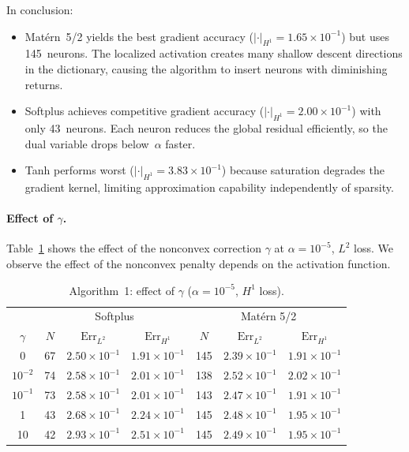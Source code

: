 \documentclass[12pt,fleqn]{amsart}
\theoremstyle{definition}
\begin{document}
In conclusion:
\begin{itemize}
	\item Mat\'ern~5/2 yields the best gradient accuracy ($|\cdot|_{H^1} = 1.65 \times 10^{-1}$) but uses 145~neurons. The localized activation creates many shallow descent directions in the dictionary, causing the algorithm to insert neurons with diminishing returns.
	\item Softplus achieves competitive gradient accuracy ($|\cdot|_{H^1} = 2.00 \times 10^{-1}$) with only 43~neurons. Each neuron reduces the global residual efficiently, so the dual variable drops below~$\alpha$ faster.
	\item Tanh performs worst ($|\cdot|_{H^1} = 3.83 \times 10^{-1}$) because saturation degrades the gradient kernel, limiting approximation capability independently of sparsity.
\end{itemize}

\paragraph{\textbf{Effect of $\gamma$.}}
Table~\ref{tab:alg1_gamma} shows the effect of the nonconvex correction $\gamma$ at $\alpha = 10^{-5}$, $L^2$ loss.
We observe the effect of the nonconvex penalty depends on the activation function. 

\begin{table}[H]
\centering
\caption{Algorithm~1: effect of $\gamma$ ($\alpha = 10^{-5}$, $H^1$ loss).}
\label{tab:alg1_gamma}
\begin{tabular}{c|ccc|ccc}
\hline
 & \multicolumn{3}{c|}{Softplus} & \multicolumn{3}{c}{Mat\'ern 5/2} \\
$\gamma$ & $N$ & $\mathrm{Err}_{L^2}$ & $\mathrm{Err}_{H^1}$ & $N$ & $\mathrm{Err}_{L^2}$ & $\mathrm{Err}_{H^1}$ \\
\hline
0 & 67 & $2.50 \times 10^{-1}$ & $1.91 \times 10^{-1}$ & 145 & $2.39 \times 10^{-1}$ & $1.91 \times 10^{-1}$ \\
$10^{-2}$ & 74 & $2.58 \times 10^{-1}$ & $2.01 \times 10^{-1}$ & 138 & $2.52 \times 10^{-1}$ & $2.02 \times 10^{-1}$ \\
$10^{-1}$ & 73 & $2.58 \times 10^{-1}$ & $2.01 \times 10^{-1}$ & 143 & $2.47 \times 10^{-1}$ & $1.91 \times 10^{-1}$ \\
1 & 43 & $2.68 \times 10^{-1}$ & $2.24 \times 10^{-1}$ & 145 & $2.48 \times 10^{-1}$ & $1.95 \times 10^{-1}$ \\
10 & 42 & $2.93 \times 10^{-1}$ & $2.51 \times 10^{-1}$ & 145 & $2.49 \times 10^{-1}$ & $1.95 \times 10^{-1}$ \\
\hline
\end{tabular}
\end{table}
\end{document}
